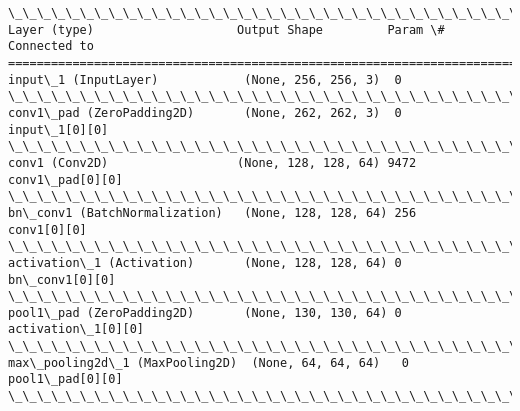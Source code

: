 \documentclass[11pt]{article}
\begin{document}
    \begin{Verbatim}[commandchars=\\\{\}]
\_\_\_\_\_\_\_\_\_\_\_\_\_\_\_\_\_\_\_\_\_\_\_\_\_\_\_\_\_\_\_\_\_\_\_\_\_\_\_\_\_\_\_\_\_\_\_\_\_\_\_\_\_\_\_\_\_\_\_\_\_\_\_\_\_\_\_\_\_\_\_\_\_\_\_\_\_\_\_\_\_\_\_\_\_\_\_\_\_\_\_\_\_\_\_\_\_\_
Layer (type)                    Output Shape         Param \#     Connected to                     
==================================================================================================
input\_1 (InputLayer)            (None, 256, 256, 3)  0                                            
\_\_\_\_\_\_\_\_\_\_\_\_\_\_\_\_\_\_\_\_\_\_\_\_\_\_\_\_\_\_\_\_\_\_\_\_\_\_\_\_\_\_\_\_\_\_\_\_\_\_\_\_\_\_\_\_\_\_\_\_\_\_\_\_\_\_\_\_\_\_\_\_\_\_\_\_\_\_\_\_\_\_\_\_\_\_\_\_\_\_\_\_\_\_\_\_\_\_
conv1\_pad (ZeroPadding2D)       (None, 262, 262, 3)  0           input\_1[0][0]                    
\_\_\_\_\_\_\_\_\_\_\_\_\_\_\_\_\_\_\_\_\_\_\_\_\_\_\_\_\_\_\_\_\_\_\_\_\_\_\_\_\_\_\_\_\_\_\_\_\_\_\_\_\_\_\_\_\_\_\_\_\_\_\_\_\_\_\_\_\_\_\_\_\_\_\_\_\_\_\_\_\_\_\_\_\_\_\_\_\_\_\_\_\_\_\_\_\_\_
conv1 (Conv2D)                  (None, 128, 128, 64) 9472        conv1\_pad[0][0]                  
\_\_\_\_\_\_\_\_\_\_\_\_\_\_\_\_\_\_\_\_\_\_\_\_\_\_\_\_\_\_\_\_\_\_\_\_\_\_\_\_\_\_\_\_\_\_\_\_\_\_\_\_\_\_\_\_\_\_\_\_\_\_\_\_\_\_\_\_\_\_\_\_\_\_\_\_\_\_\_\_\_\_\_\_\_\_\_\_\_\_\_\_\_\_\_\_\_\_
bn\_conv1 (BatchNormalization)   (None, 128, 128, 64) 256         conv1[0][0]                      
\_\_\_\_\_\_\_\_\_\_\_\_\_\_\_\_\_\_\_\_\_\_\_\_\_\_\_\_\_\_\_\_\_\_\_\_\_\_\_\_\_\_\_\_\_\_\_\_\_\_\_\_\_\_\_\_\_\_\_\_\_\_\_\_\_\_\_\_\_\_\_\_\_\_\_\_\_\_\_\_\_\_\_\_\_\_\_\_\_\_\_\_\_\_\_\_\_\_
activation\_1 (Activation)       (None, 128, 128, 64) 0           bn\_conv1[0][0]                   
\_\_\_\_\_\_\_\_\_\_\_\_\_\_\_\_\_\_\_\_\_\_\_\_\_\_\_\_\_\_\_\_\_\_\_\_\_\_\_\_\_\_\_\_\_\_\_\_\_\_\_\_\_\_\_\_\_\_\_\_\_\_\_\_\_\_\_\_\_\_\_\_\_\_\_\_\_\_\_\_\_\_\_\_\_\_\_\_\_\_\_\_\_\_\_\_\_\_
pool1\_pad (ZeroPadding2D)       (None, 130, 130, 64) 0           activation\_1[0][0]               
\_\_\_\_\_\_\_\_\_\_\_\_\_\_\_\_\_\_\_\_\_\_\_\_\_\_\_\_\_\_\_\_\_\_\_\_\_\_\_\_\_\_\_\_\_\_\_\_\_\_\_\_\_\_\_\_\_\_\_\_\_\_\_\_\_\_\_\_\_\_\_\_\_\_\_\_\_\_\_\_\_\_\_\_\_\_\_\_\_\_\_\_\_\_\_\_\_\_
max\_pooling2d\_1 (MaxPooling2D)  (None, 64, 64, 64)   0           pool1\_pad[0][0]                  
\_\_\_\_\_\_\_\_\_\_\_\_\_\_\_\_\_\_\_\_\_\_\_\_\_\_\_\_\_\_\_\_\_\_\_\_\_\_\_\_\_\_\_\_\_\_\_\_\_\_\_\_\_\_\_\_\_\_\_\_\_\_\_\_\_\_\_\_\_\_\_\_\_\_\_\_\_\_\_\_\_\_\_\_\_\_\_\_\_\_\_\_\_\_\_\_\_\_

\end{Verbatim}
\end{document}

